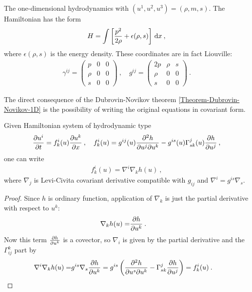 \begin{example}
    The one-dimensional hydrodynamics with $(u^1,u^2,u^3) = (\rho, m, s)$. The Hamiltonian has the form
    \begin{align}
        H = \int \left[ \frac{p^2}{2 \rho} + \epsilon(\rho,s) \right] \, \mathrm{d} x \:,
    \end{align}
    where $\epsilon(\rho,s)$ is the energy density. These coordinates are in fact Liouville:
    \begin{align}
        \gamma^{ij} = \begin{pmatrix}
            p & 0 & 0 \\ \rho & 0 & 0 \\ s & 0 & 0
        \end{pmatrix}
        \:, \quad
        g^{ij} = \begin{pmatrix}
            2p & \rho & s \\ \rho & 0 & 0 \\ s & 0 & 0
        \end{pmatrix}
        \:.
    \end{align}
\end{example}

The direct consequence of the Dubrovin-Novikov theorem \vref{Theorem-Dubrovin-Novikov-1D} is the possibility of writing the original equations in covariant form.

\begin{theorem} \label{theorem:covariant}
    Given Hamiltonian system of hydrodynamic type
    \begin{align}
        \frac{\partial u^i}{\partial t} = f^i_k(u) \frac{\partial u^k}{\partial x} \:, \quad f^i_k(u) = g^{ij}(u) \frac{\partial^2 h}{\partial u^j \partial u^k} - g^{is}(u) \Gamma^j_{sk}(u) \frac{\partial h}{\partial u^j} \:, \label{eq:hamiltonovsky-system}
    \end{align}
    one can write
    \begin{align}
        f^i_k(u) = \nabla^i \nabla_k h(u) \:, 
    \end{align}
    where $\nabla_j$ is Levi-Civita covariant derivative compatible with $g_{ij}$ and $\nabla^i = g^{is} \nabla_s$. 
\end{theorem}
\begin{proof}
    Since $h$ is ordinary function, application of $\nabla_k$ is just the partial derivative with respect to $u^k$:
    \begin{align}
        \nabla_k h(u) =& \frac{\partial h}{\partial u^k} \:.
    \end{align}
    Now this term $\frac{\partial h}{\partial u^k}$ is a covector, so $\nabla_i$ is given by the partial derivative and the $\Gamma_{ij}^k$ part by
    \begin{align}
        \nabla^i \nabla_k h(u) =& g^{is} \nabla_s \frac{\partial h}{\partial u^k} = g^{is} \left( \frac{\partial^2 h}{\partial u^s \partial u^k} - \Gamma^j_{sk} \frac{\partial h}{\partial u^j} \right) = f^i_k(u) \:.
    \end{align}
\end{proof}
